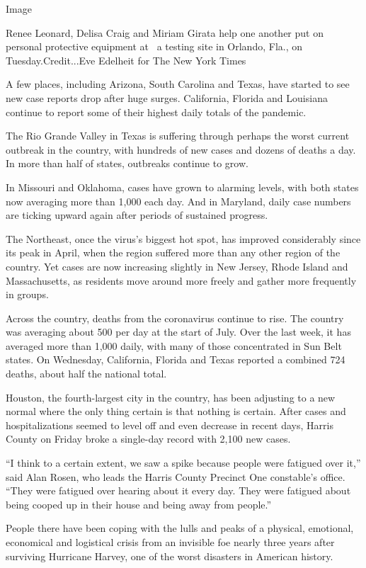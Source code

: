 Image

Renee Leonard, Delisa Craig and Miriam Girata help one another put on
personal protective equipment at~ a testing site in Orlando, Fla., on
Tuesday.Credit...Eve Edelheit for The New York Times

A few places, including Arizona, South Carolina and Texas, have started
to see new case reports drop after huge surges. California, Florida and
Louisiana continue to report some of their highest daily totals of the
pandemic.

The Rio Grande Valley in Texas is suffering through perhaps the worst
current outbreak in the country, with hundreds of new cases and dozens
of deaths a day. In more than half of states, outbreaks continue to
grow.

In Missouri and Oklahoma, cases have grown to alarming levels, with both
states now averaging more than 1,000 each day. And in Maryland, daily
case numbers are ticking upward again after periods of sustained
progress.

The Northeast, once the virus's biggest hot spot, has improved
considerably since its peak in April, when the region suffered more than
any other region of the country. Yet cases are now increasing slightly
in New Jersey, Rhode Island and Massachusetts, as residents move around
more freely and gather more frequently in groups.

Across the country, deaths from the coronavirus continue to rise. The
country was averaging about 500 per day at the start of July. Over the
last week, it has averaged more than 1,000 daily, with many of those
concentrated in Sun Belt states. On Wednesday, California, Florida and
Texas reported a combined 724 deaths, about half the national total.

Houston, the fourth-largest city in the country, has been adjusting to a
new normal where the only thing certain is that nothing is certain.
After cases and hospitalizations seemed to level off and even decrease
in recent days, Harris County on Friday broke a single-day record with
2,100 new cases.

``I think to a certain extent, we saw a spike because people were
fatigued over it,'' said Alan Rosen, who leads the Harris County
Precinct One constable's office. ``They were fatigued over hearing about
it every day. They were fatigued about being cooped up in their house
and being away from people.''

People there have been coping with the lulls and peaks of a physical,
emotional, economical and logistical crisis from an invisible foe nearly
three years after surviving Hurricane Harvey, one of the worst disasters
in American history.

